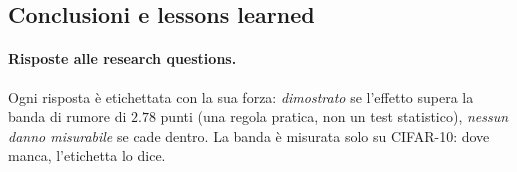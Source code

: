 \documentclass[
  11pt,
]{article}
\begin{document}
\subsection{Conclusioni e lessons learned}
\label{sec:progetto-conclusioni}

\paragraph{Risposte alle research questions.} Ogni risposta è etichettata con la sua forza: \emph{dimostrato} se l'effetto supera la banda di rumore di $2.78$ punti (una regola pratica, non un test statistico), \emph{nessun danno misurabile} se cade dentro. La banda è misurata solo su CIFAR-10: dove manca, l'etichetta lo dice.
\end{document}
